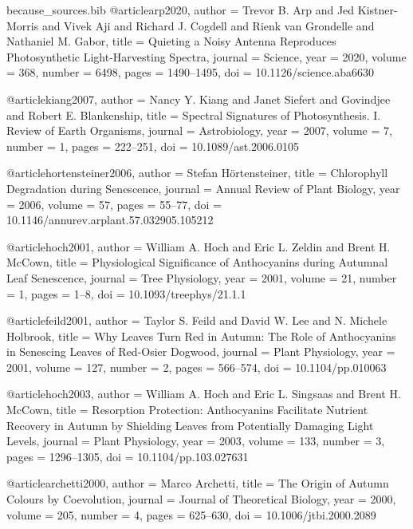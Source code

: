 \begin{filecontents*}{because_sources.bib}
@article{arp2020,
  author  = {Trevor B. Arp and Jed Kistner-Morris and Vivek Aji and Richard J. Cogdell and Rienk van Grondelle and Nathaniel M. Gabor},
  title   = {Quieting a Noisy Antenna Reproduces Photosynthetic Light-Harvesting Spectra},
  journal = {Science},
  year    = {2020},
  volume  = {368},
  number  = {6498},
  pages   = {1490--1495},
  doi     = {10.1126/science.aba6630}
}

@article{kiang2007,
  author  = {Nancy Y. Kiang and Janet Siefert and Govindjee and Robert E. Blankenship},
  title   = {Spectral Signatures of Photosynthesis. {I}. Review of Earth Organisms},
  journal = {Astrobiology},
  year    = {2007},
  volume  = {7},
  number  = {1},
  pages   = {222--251},
  doi     = {10.1089/ast.2006.0105}
}

@article{hortensteiner2006,
  author  = {Stefan H\"ortensteiner},
  title   = {Chlorophyll Degradation during Senescence},
  journal = {Annual Review of Plant Biology},
  year    = {2006},
  volume  = {57},
  pages   = {55--77},
  doi     = {10.1146/annurev.arplant.57.032905.105212}
}

@article{hoch2001,
  author  = {William A. Hoch and Eric L. Zeldin and Brent H. McCown},
  title   = {Physiological Significance of Anthocyanins during Autumnal Leaf Senescence},
  journal = {Tree Physiology},
  year    = {2001},
  volume  = {21},
  number  = {1},
  pages   = {1--8},
  doi     = {10.1093/treephys/21.1.1}
}

@article{feild2001,
  author  = {Taylor S. Feild and David W. Lee and N. Michele Holbrook},
  title   = {Why Leaves Turn Red in Autumn: The Role of Anthocyanins in Senescing Leaves of Red-Osier Dogwood},
  journal = {Plant Physiology},
  year    = {2001},
  volume  = {127},
  number  = {2},
  pages   = {566--574},
  doi     = {10.1104/pp.010063}
}

@article{hoch2003,
  author  = {William A. Hoch and Eric L. Singsaas and Brent H. McCown},
  title   = {Resorption Protection: Anthocyanins Facilitate Nutrient Recovery in Autumn by Shielding Leaves from Potentially Damaging Light Levels},
  journal = {Plant Physiology},
  year    = {2003},
  volume  = {133},
  number  = {3},
  pages   = {1296--1305},
  doi     = {10.1104/pp.103.027631}
}

@article{archetti2000,
  author  = {Marco Archetti},
  title   = {The Origin of Autumn Colours by Coevolution},
  journal = {Journal of Theoretical Biology},
  year    = {2000},
  volume  = {205},
  number  = {4},
  pages   = {625--630},
  doi     = {10.1006/jtbi.2000.2089}
}


\end{filecontents*}
